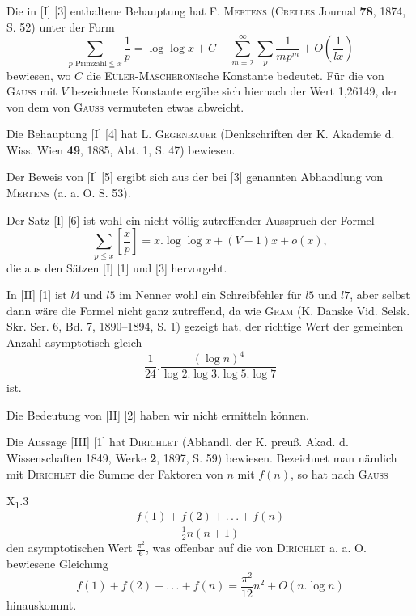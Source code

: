 Die in [I] [3] enthaltene Behauptung hat F. \textsc{Mertens} (\textsc{Crelles} Journal \textbf{78}, 1874, S. 52) unter der Form
\[
\sum_{p\text{ Primzahl}\leqq x}\frac1p
=\log\log x+C-\sum_{m=2}^{\infty}\sum_p\frac1{mp^m}+O\left(\frac1{lx}\right)
\]
bewiesen, wo \(C\) die \textsc{Euler-Mascheroni}sche Konstante bedeutet. Für die von \textsc{Gauss} mit \(V\) bezeichnete Konstante ergäbe sich hiernach der Wert 1,26149, der von dem von \textsc{Gauss} vermuteten etwas abweicht.

Die Behauptung [I] [4] hat L. \textsc{Gegenbauer} (Denkschriften der K. Akademie d. Wiss. Wien \textbf{49}, 1885, Abt. 1, S. 47) bewiesen.

Der Beweis von [I] [5] ergibt sich aus der bei [3] genannten Abhandlung von \textsc{Mertens} (a. a. O. S. 53).

Der Satz [I] [6] ist wohl ein nicht völlig zutreffender Ausspruch der Formel
\[
\sum_{p\leqq x}\left[\frac{x}{p}\right]=x.\log\log x+(V-1)x+o(x),
\]
die aus den Sätzen [I] [1] und [3] hervorgeht.

In [II] [1] ist \(l4\) und \(l5\) im Nenner wohl ein Schreibfehler für \(l5\) und \(l7\), aber selbst dann wäre die Formel nicht ganz zutreffend, da wie \textsc{Gram} (K. Danske Vid. Selsk. Skr. Ser. 6, Bd. 7, 1890--1894, S. 1) gezeigt hat, der richtige Wert der gemeinten Anzahl asymptotisch gleich
\[
\frac1{24}.\frac{(\log n)^4}{\log2.\log3.\log5.\log7}
\]
ist.

Die Bedeutung von [II] [2] haben wir nicht ermitteln können.

Die Aussage [III] [1] hat \textsc{Dirichlet} (Abhandl. der K. preuß. Akad. d. Wissenschaften 1849, Werke \textbf{2}, 1897, S. 59) bewiesen. Bezeichnet man nämlich mit \textsc{Dirichlet} die Summe der Faktoren von \(n\) mit \(f(n)\), so hat nach \textsc{Gauss}
\par\vfill\noindent X\textsubscript{1}.\hfill 3
\clearpage
{}
\[
\frac{f(1)+f(2)+.\,.\,.+f(n)}{\frac12n(n+1)}
\]
\noindent den asymptotischen Wert \(\frac{\pi^2}{6}\), was offenbar auf die von \textsc{Dirichlet} a. a. O. bewiesene Gleichung
\[
f(1)+f(2)+.\,.\,.+f(n)=\frac{\pi^2}{12}n^2+O(n.\log n)
\]
hinauskommt.

